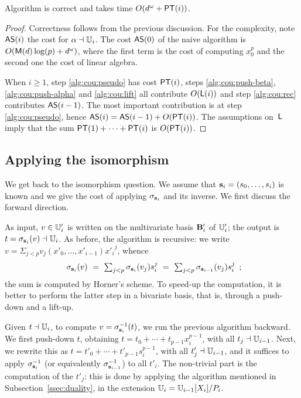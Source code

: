 \begin{theorem}\label{theo:AS}
  Algorithm  is correct and takes time $O(d^\omega
  + \mathrm{\sf PT}(i))$.
\end{theorem}
\begin{proof} Correctness follows from the previous discussion.  For the
complexity, note ${\sf AS}(i)$ the cost for $\alpha\dashv\mathbb{U}_i$. The cost
${\sf AS}(0)$ of the naive algorithm is $O(\mathrm{\sf M}(d)\log(p) +
d^\omega)$, where the first term is the cost of computing $x_0^p$ and
the second one the cost of linear algebra.

When $i\ge1$, step \ref{alg:cou:pseudo} has cost $\mathrm{\sf PT}(i)$, steps
\ref{alg:cou:push-beta}, \ref{alg:cou:push-alpha} and
\ref{alg:cou:lift} all contribute $O(\mathsf{L}(i))$ and step
\ref{alg:cou:rec} contributes ${\sf AS}(i-1)$. The most important
contribution is at step \ref{alg:cou:pseudo}, hence ${\sf AS}(i) =
{\sf AS}(i-1) + O(\mathrm{\sf PT}(i))$. The assumptions on~$\mathsf{L}$ imply that the
sum $\mathrm{\sf PT}(1) + \cdots + \mathrm{\sf PT}(i)$ is $O(\mathrm{\sf PT}(i))$. \end{proof}


\subsection{Applying the isomorphism}

We get back to the isomorphism question. We assume that
$\mathbf{s}_i=(s_0,\dots,s_i)$ is known and we give the cost of applying
$\sigma_{\mathbf{s}_i}$ and its inverse.  We first discuss the forward
direction.

As input, $v \in \mathbb{U}'_i$ is written on the multivariate basis $\mathbf{B}'_i$
of $\mathbb{U}'_i$; the output is $t=\sigma_{\mathbf{s}_i}(v) \dashv \mathbb{U}_i$. As before,
the algorithm is recursive: we write $v=\Sigma_{j <p}
v_j(x'_0,\dots,x'_{i-1}) {x'_i}^j$, whence
$$\begin{array}{c}\sigma_{\bs_i}(v)\ =\ \sum_{j
  <p} \sigma_{\bs_i}(v_j) s_i^j\ =\ \sum_{j
  <p} \sigma_{\bs_{i-1}}(v_j) s_i^j
\end{array}
;$$ the sum is computed by Horner's scheme.
To speed-up the computation, it is better to
perform the latter step in a bivariate basis, that is, through a
push-down and a lift-up.



Given $t \dashv \mathbb{U}_i$, to compute $v=\sigma_{\mathbf{s}_i}^{-1}(t)$, we run the
previous algorithm backward. We first push-down $t$, obtaining $t=t_0
+ \cdots + t_{p-1}x_i^{p-1}$, with all $t_j \dashv \mathbb{U}_{i-1}$. Next, we
rewrite this as $t=t'_0+\cdots + t'_{p-1}s_i^{p-1}$, with all $t'_j
\dashv \mathbb{U}_{i-1}$, and it suffices to apply $\sigma_{\mathbf{s}_i}^{-1}$ (or
equivalently $\sigma_{\mathbf{s}_{i-1}}^{-1}$) to all $t'_i$. The non-trivial
part is the computation of the $t'_j$: this is done by applying the
algorithm  mentioned in
Subsection~\ref{ssec:duality}, in the extension $\mathbb{U}_i=
\mathbb{U}_{i-1}[X_i]/P_i$.



